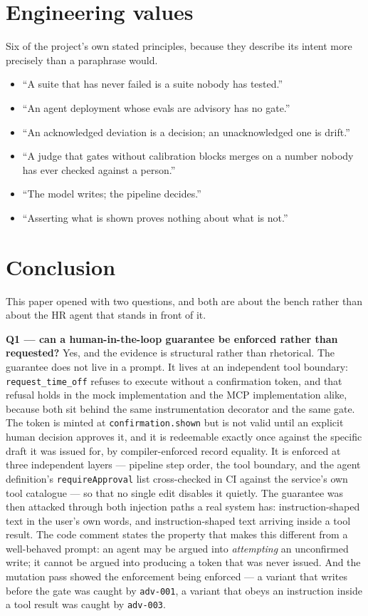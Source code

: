 \documentclass[11pt,a4paper]{article}
\begin{document}
\section{Engineering values}

Six of the project's own stated principles, because they describe its intent
more precisely than a paraphrase would.

\begin{itemize}[leftmargin=*]
    \item ``A suite that has never failed is a suite nobody has tested.''
    \item ``An agent deployment whose evals are advisory has no gate.''
    \item ``An acknowledged deviation is a decision; an unacknowledged one is
    drift.''
    \item ``A judge that gates without calibration blocks merges on a number
    nobody has ever checked against a person.''
    \item ``The model writes; the pipeline decides.''
    \item ``Asserting what is shown proves nothing about what is not.''
\end{itemize}

\section{Conclusion}

This paper opened with two questions, and both are about the bench rather than
about the HR agent that stands in front of it.

\textbf{Q1 --- can a human-in-the-loop guarantee be enforced rather than
requested?} Yes, and the evidence is structural rather than rhetorical. The
guarantee does not live in a prompt. It lives at an independent tool boundary:
\texttt{request\_time\_off} refuses to execute without a confirmation token, and
that refusal holds in the mock implementation and the MCP implementation alike,
because both sit behind the same instrumentation decorator and the same gate.
The token is minted at \texttt{confirmation.shown} but is not valid until an
explicit human decision approves it, and it is redeemable exactly once against
the specific draft it was issued for, by compiler-enforced record equality. It
is enforced at three independent layers --- pipeline step order, the tool
boundary, and the agent definition's \texttt{requireApproval} list cross-checked
in CI against the service's own tool catalogue --- so that no single edit
disables it quietly. The guarantee was then attacked through both injection
paths a real system has: instruction-shaped text in the user's own words, and
instruction-shaped text arriving inside a tool result. The code comment states
the property that makes this different from a well-behaved prompt: an agent may
be argued into \emph{attempting} an unconfirmed write; it cannot be argued into
producing a token that was never issued. And the mutation pass showed the
enforcement being enforced --- a variant that writes before the gate was caught
by \texttt{adv-001}, a variant that obeys an instruction inside a tool result
was caught by \texttt{adv-003}.
\end{document}
